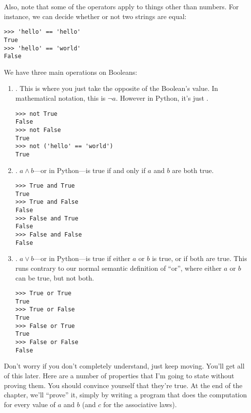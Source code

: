 Also, note that some of the operators apply to things other than
numbers. For instance, we can decide whether or not two strings are
equal:

\begin{lstlisting}
>>> 'hello' == 'hello'
True
>>> 'hello' == 'world'
False
\end{lstlisting}

We have three main operations on Booleans:

\begin{enumerate}
\item {}. This is where you just take the opposite of the
  Boolean's value. In mathematical notation, this is $\lnot
  a$. However in Python, it's just .

\begin{lstlisting}
>>> not True
False
>>> not False
True
>>> not ('hello' == 'world')
True
\end{lstlisting}

\item {}. $a \land b$---or  in
  Python---is true if and only if $a$ and $b$ are both true.

\begin{lstlisting}
>>> True and True
True
>>> True and False
False
>>> False and True
False
>>> False and False
False
\end{lstlisting}

\item {}. $a \lor b$---or  in Python---is
  true if either $a$ or $b$ is true, or if both are true. This runs
  contrary to our normal semantic definition of ``or'', where either
  $a$ or $b$ can be true, but not both.

\begin{lstlisting}
>>> True or True
True
>>> True or False
True
>>> False or True
True
>>> False or False
False
\end{lstlisting}
\end{enumerate}

Don't worry if you don't completely understand, just keep
moving. You'll get all of this later.  Here are a number of properties
that I'm going to state without proving them. You should convince
yourself that they're true. At the end of the chapter, we'll ``prove''
it, simply by writing a program that does the computation for every
value of $a$ and $b$ (and $c$ for the associative laws).

